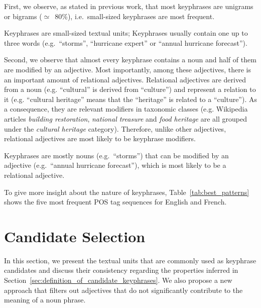     First, we observe, as stated in previous work, that most keyphrases are
    unigrams or bigrams ($\simeq$~80\%), i.e.~small-sized keyphrases are most
    frequent.
    
    \begin{property}\label{prop:informativity}
      Keyphrases are small-sized textual units; Keyphrases usually contain one
      up to three words (e.g.~``storms'', ``hurricane expert'' or ``annual
      hurricane forecast'').
    \end{property}

    Second, we observe that almost every keyphrase contains a noun and half of
    them are modified by an adjective. Most importantly, among these adjectives,
    there is an important amount of relational adjectives. Relational adjectives
    are derived from a noun (e.g. ``cultural'' is derived from ``culture'') and
    represent a relation to it (e.g. ``cultural heritage'' means that the
    ``heritage'' is related to a ``culture''). As a consequence, they are
    relevant modifiers in taxonomic classes (e.g. Wikipedia articles
    \textit{building restoration}, \textit{national treasure} and \textit{food
    heritage} are all grouped under the \textit{cultural heritage} category).
    Therefore, unlike other adjectives, relational adjectives are most likely to
    be keyphrase modifiers.

    \begin{property}\label{prop:noun_phrases}
      Keyphrases are mostly nouns (e.g.~``storms'') that can be modified by an
      adjective (e.g.~``annual hurricane forecast''), which is most likely to be
      a relational adjective.
    \end{property}

    To give more insight about the nature of keyphrases,
    Table~\ref{tab:best_patterns} shows the five most frequent POS tag sequences
    for English and French.

\section{Candidate Selection}
\label{sec:candidate_extraction}
  In this section, we present the textual units that are commonly used as
  keyphrase candidates and discuss their consistency regarding the properties
  inferred in Section~\ref{sec:definition_of_candidate_keyphrases}. We also
  propose a new approach that filters out adjectives that do not significantly
  contribute to the meaning of a noun phrase.

